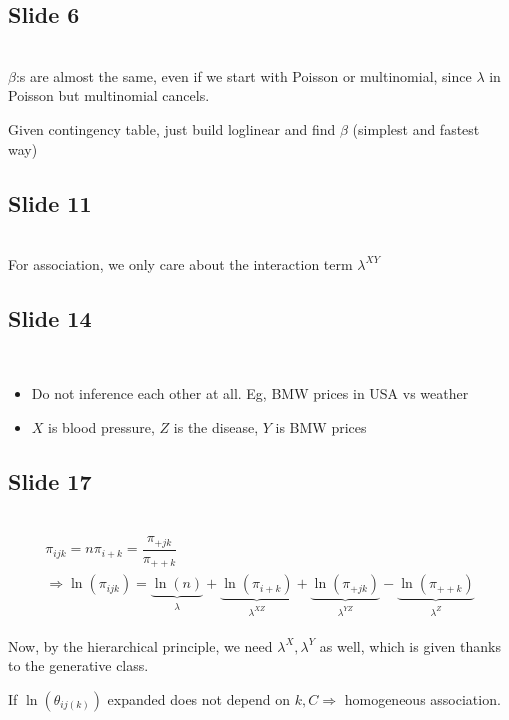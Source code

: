 \subsection{Slide 6}\hfill\\
\noindent $\beta$:s are almost the same, even if we start with Poisson or multinomial, since $\lambda$  in Poisson but multinomial cancels.\par
\noindent Given contingency table, just build loglinear and find $\beta$  (simplest and fastest way)
\par\bigskip
\subsection{Slide 11}\hfill\\
\noindent For association, we only care about the interaction term  $\lambda^{XY}$
\par\bigskip
\subsection{Slide 14}\hfill\\
\begin{itemize}
  \item Do not inference each other at all. Eg, BMW prices in USA vs weather
  \item $X$ is blood pressure, $Z$ is the disease, $Y$ is BMW prices
\end{itemize}
\par\bigskip
\subsection{Slide 17}\hfill\\
\begin{equation*}
  \begin{gathered}
    \pi_{ijk} = n\pi_{i+k} = \dfrac{\pi_{+jk}}{\pi_{++k}}\\
    \Rightarrow \ln{\left(\pi_{ijk}\right)} = \underbrace{\ln{\left(n\right)}}_{\substack{\lambda}}+\underbrace{\ln{\left(\pi_{i+k}\right)}}_{\substack{\lambda^{XZ}}}+\underbrace{\ln{\left(\pi_{+jk}\right)}}_{\substack{\lambda^{YZ}}}-\underbrace{\ln{\left(\pi_{++k}\right)}}_{\substack{\lambda^Z}}
  \end{gathered}
\end{equation*}\par
\noindent Now, by the hierarchical principle, we need $\lambda^X,\lambda^Y$ as well, which is given thanks to the generative class.
\par\bigskip
\noindent If $\ln{\left(\theta_{ij(k)}\right)}$ expanded does not depend on $k,C\Rightarrow$ homogeneous association.
\par\bigskip

